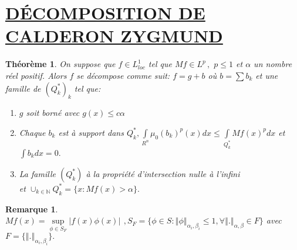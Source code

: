 \documentclass[12pt, a4paper, oneside]{article}
\newtheorem{maremarque}{Remarque}
\newtheorem{montheoreme}{Théorème}
\begin{document}
\section{\underline{DÉCOMPOSITION DE CALDERON ZYGMUND}}

\begin{montheoreme}
	On suppose que $f\in L_{loc}^{1}$ tel que $Mf\in L^{p}\,,$ $p\leq 1$ et $
	\alpha $ un nombre réel positif. Alors $f$ se décompose comme suit: $f=g+b$ où $b=\sum b_{k}$
	et une famille de $(Q_{k}^{\ast })_{k}$ tel que:
	\begin{enumerate}
		\item[(i)] $g$ soit borné avec $g(x)\leq c\alpha $
		\item[(ii)] Chaque $b_{k}$ est à support dans $Q_{k}^{\ast},\int\limits_{R^{n}}\mu _{0}(b_{k})^{p}(x)dx\leq \int\limits_{Q_{k}^{\ast}}Mf(x)^{p}dx$ et $\int b_{k}dx=0.$
		\item[(iii)] La famille $(Q_{k}^{\ast })$ à la propriété d'intersection nulle à l'infini \\et $\cup _{k\in \mathbb{N}}Q_{k}^{\ast }=\{x:Mf(x)>\alpha \}.$
	\end{enumerate} 
\end{montheoreme}

\begin{maremarque}
	$Mf(x)=\underset{\phi \in S_{F}}{\sup }\left\vert f(x)\phi
	(x)\right\vert \,\ ,S_{F}=\{\phi \in S:\left\Vert \phi \right\Vert _{\alpha
		_{i},\beta _{i}}\leq 1,\forall \left\Vert .\right\Vert _{\alpha ,\beta }\in
	F\}$ avec $F=\{\left\Vert .\right\Vert _{\alpha _{i},\beta _{i}}\}.$
\end{maremarque}
\end{document}
